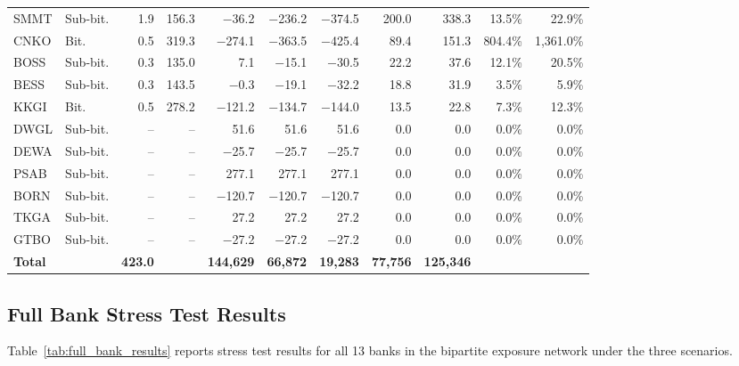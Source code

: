 \begin{landscape}
\begin{longtable}{llrrrrrrrrr}
SMMT & Sub-bit. & 1.9 & 156.3 & $-$36.2 & $-$236.2 & $-$374.5 & 200.0 & 338.3 & 13.5\% & 22.9\% \\
CNKO & Bit. & 0.5 & 319.3 & $-$274.1 & $-$363.5 & $-$425.4 & 89.4 & 151.3 & 804.4\% & 1,361.0\% \\
BOSS & Sub-bit. & 0.3 & 135.0 & 7.1 & $-$15.1 & $-$30.5 & 22.2 & 37.6 & 12.1\% & 20.5\% \\
BESS & Sub-bit. & 0.3 & 143.5 & $-$0.3 & $-$19.1 & $-$32.2 & 18.8 & 31.9 & 3.5\% & 5.9\% \\
KKGI & Bit. & 0.5 & 278.2 & $-$121.2 & $-$134.7 & $-$144.0 & 13.5 & 22.8 & 7.3\% & 12.3\% \\
DWGL & Sub-bit. & -- & -- & 51.6 & 51.6 & 51.6 & 0.0 & 0.0 & 0.0\% & 0.0\% \\
DEWA & Sub-bit. & -- & -- & $-$25.7 & $-$25.7 & $-$25.7 & 0.0 & 0.0 & 0.0\% & 0.0\% \\
PSAB & Sub-bit. & -- & -- & 277.1 & 277.1 & 277.1 & 0.0 & 0.0 & 0.0\% & 0.0\% \\
BORN & Sub-bit. & -- & -- & $-$120.7 & $-$120.7 & $-$120.7 & 0.0 & 0.0 & 0.0\% & 0.0\% \\
TKGA & Sub-bit. & -- & -- & 27.2 & 27.2 & 27.2 & 0.0 & 0.0 & 0.0\% & 0.0\% \\
GTBO & Sub-bit. & -- & -- & $-$27.2 & $-$27.2 & $-$27.2 & 0.0 & 0.0 & 0.0\% & 0.0\% \\
\midrule
\textbf{Total} & & \textbf{423.0} & & \textbf{144,629} & \textbf{66,872} & \textbf{19,283} & \textbf{77,756} & \textbf{125,346} & & \\
\end{longtable}
\end{landscape}



\subsection{Full Bank Stress Test Results}
\label{subsec:full_bank}

Table~\ref{tab:full_bank_results} reports stress test results for all 13 banks in the bipartite exposure network under the three scenarios.

